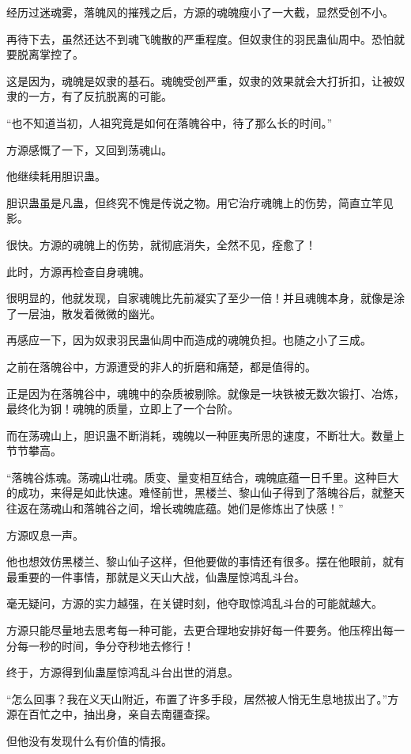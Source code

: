\begin{this_body}
经历过迷魂雾，落魄风的摧残之后，方源的魂魄瘦小了一大截，显然受创不小。

再待下去，虽然还达不到魂飞魄散的严重程度。但奴隶住的羽民蛊仙周中。恐怕就要脱离掌控了。

这是因为，魂魄是奴隶的基石。魂魄受创严重，奴隶的效果就会大打折扣，让被奴隶的一方，有了反抗脱离的可能。

“也不知道当初，人祖究竟是如何在落魄谷中，待了那么长的时间。”

方源感慨了一下，又回到荡魂山。

他继续耗用胆识蛊。

胆识蛊虽是凡蛊，但终究不愧是传说之物。用它治疗魂魄上的伤势，简直立竿见影。

很快。方源的魂魄上的伤势，就彻底消失，全然不见，痊愈了！

此时，方源再检查自身魂魄。

很明显的，他就发现，自家魂魄比先前凝实了至少一倍！并且魂魄本身，就像是涂了一层油，散发着微微的幽光。

再感应一下，因为奴隶羽民蛊仙周中而造成的魂魄负担。也随之小了三成。

之前在落魄谷中，方源遭受的非人的折磨和痛楚，都是值得的。

正是因为在落魄谷中，魂魄中的杂质被剔除。就像是一块铁被无数次锻打、冶炼，最终化为钢！魂魄的质量，立即上了一个台阶。

而在荡魂山上，胆识蛊不断消耗，魂魄以一种匪夷所思的速度，不断壮大。数量上节节攀高。

“落魄谷炼魂。荡魂山壮魂。质变、量变相互结合，魂魄底蕴一日千里。这种巨大的成功，来得是如此快速。难怪前世，黑楼兰、黎山仙子得到了落魄谷后，就整天往返在荡魂山和落魄谷之间，增长魂魄底蕴。她们是修炼出了快感！”

方源叹息一声。

他也想效仿黑楼兰、黎山仙子这样，但他要做的事情还有很多。摆在他眼前，就有最重要的一件事情，那就是义天山大战，仙蛊屋惊鸿乱斗台。

毫无疑问，方源的实力越强，在关键时刻，他夺取惊鸿乱斗台的可能就越大。

方源只能尽量地去思考每一种可能，去更合理地安排好每一件要务。他压榨出每一分每一秒的时间，争分夺秒地去修行！

终于，方源得到仙蛊屋惊鸿乱斗台出世的消息。

“怎么回事？我在义天山附近，布置了许多手段，居然被人悄无生息地拔出了。”方源在百忙之中，抽出身，亲自去南疆查探。

但他没有发现什么有价值的情报。


\end{this_body}

